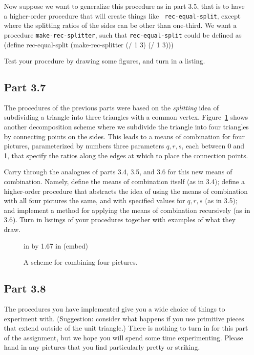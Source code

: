 Now suppose we want to generalize this procedure as in part 3.5, that
is to have a higher-order procedure that will create things like {\tt
rec-equal-split}, except where the splitting ratios of the sides can
be other than one-third.  We want a procedure {\tt make-rec-splitter},
such that {\tt rec-equal-split} could be defined as
\beginlisp
(define rec-equal-split (make-rec-splitter (/ 1 3) (/ 1 3)))
\endlisp

Test your procedure by drawing some figures, and turn in a listing.

\subsection{Part 3.7}

The procedures of the previous parts were based on the {\it splitting}
idea of subdividing a triangle into three triangles with a common
vertex.  Figure~\ref{embed} shows another decomposition scheme where
we subdivide the triangle into four triangles by connecting points on
the sides.  This leads to a means of combination for four pictures,
parameterized by numbers three parameters $q, r, s$, each between 0
and 1, that specify the ratios along the edges at which to place the
connection points.

Carry through the analogues of parts 3.4, 3.5, and 3.6 for this new
means of combination.  Namely, define the means of combination itself
(as in 3.4); define a higher-order procedure that abstracts the idea
of using the means of combination with all four pictures the same, and
with specified values for $q, r, s$ (as in 3.5); and implement a
method for applying the means of combination recursively (as in 3.6).
Turn in listings of your procedures together with examples of what
they draw.


\begin{figure}
 in by 1.67 in (embed)
\caption{{\protect\footnotesize
A scheme for combining four pictures.}}
\label{embed}
\end{figure} 

\subsection{Part 3.8}

The procedures you have implemented give you a wide choice of things
to experiment with.  (Suggestion: consider what happens if you use
primitive pieces that extend outside of the unit triangle.)  There is
nothing to turn in for this part of the assignment, but we hope you
will spend some time experimenting.  Please hand in any pictures that
you find particularly pretty or striking.

